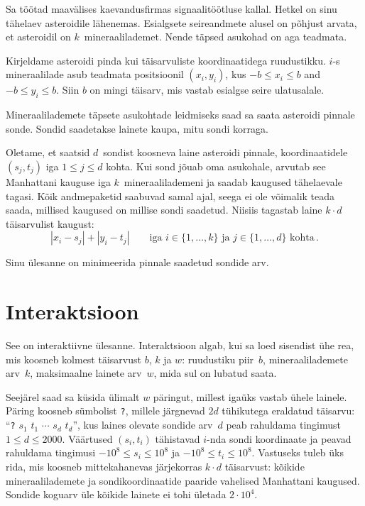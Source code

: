 

\noindent
Sa töötad maavälises kaevandusfirmas signaalitöötluse kallal. Hetkel on sinu tähelaev asteroidile lähenemas.
Esialgsete seireandmete alusel on põhjust arvata, et asteroidil on $k$~mineraalilademet. Nende täpsed asukohad on aga teadmata.

\medskip

Kirjeldame asteroidi pinda kui täisarvuliste koordinaatidega ruudustikku.
$i$-s mineraalilade asub teadmata positsioonil $(x_i, y_i)$, kus
$-b \le x_i \le b$ and $-b\le y_i \le b$. %
Siin $b$ on mingi täisarv, mis vastab esialgse seire ulatusalale.

Mineraalilademete täpsete asukohtade leidmiseks saad sa saata asteroidi pinnale sonde.
Sondid saadetakse lainete kaupa, mitu sondi korraga.

Oletame, et saatsid $d$~sondist koosneva laine asteroidi pinnale, koordinaatidele $(s_j,t_j)$
iga $1 \leq j \leq d$ kohta.
Kui sond jõuab oma asukohale, arvutab see Manhattani kauguse iga $k$~mineraalilademeni ja saadab kaugused tähelaevale tagasi.
Kõik andmepaketid saabuvad samal ajal, seega ei ole võimalik teada saada, millised kaugused on millise sondi saadetud.
Niisiis tagastab laine $k\cdot d$ täisarvulist kaugust:
\[|x_i-s_j| + |y_i - t_j| \qquad\text{iga } i \in \{1,\ldots,k\} \text{ ja } j \in\{ 1,\ldots,d\} \text{ kohta}\,.\]

Sinu ülesanne on minimeerida pinnale saadetud sondide arv.

\section*{Interaktsioon}

See on interaktiivne ülesanne.
Interaktsioon algab, kui sa loed sisendist ühe rea, mis koosneb kolmest täisarvust $b$, $k$ ja $w$:
ruudustiku piir~$b$,
mineraalilademete arv~$k$,
maksimaalne lainete arv~$w$, mida sul on lubatud saata.

Seejärel saad sa küsida ülimalt $w$ päringut, millest igaüks vastab ühele lainele.
Päring koosneb sümbolist \texttt{?}, millele järgnevad $2d$ tühikutega eraldatud täisarvu:
``\texttt{?} $s_1$ $t_1$ $\cdots$ $s_d$ $t_d$'', kus laines olevate sondide arv~$d$ peab rahuldama
tingimust $1\leq d\leq 2000$. %
Väärtused $(s_i, t_i)$ tähistavad $i$-nda sondi koordinaate ja peavad rahuldama tingimusi
$-10^8 \leq s_i \leq 10^8$ ja $-10^8 \leq t_i \leq 10^8$. %
Vastuseks tuleb üks rida, mis koosneb mittekahanevas järjekorras $k \cdot d$ täisarvust:
kõikide mineraalilademete ja sondikoordinaatide paaride vahelised Manhattani kaugused.
Sondide koguarv üle kõikide lainete ei tohi ületada
$2\cdot 10^4.$ %

